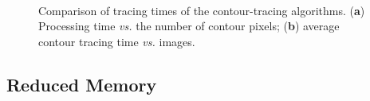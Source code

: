 \documentclass[sensors,article,accept,moreauthors,pdftex,10pt,a4paper]{mdpi}
\begin{document}
\begin{figure}[H]
	\centering
	\\

	\caption{Comparison of tracing times of the contour-tracing algorithms. (\textbf{a}) Processing time \emph{vs.} the number of contour pixels; (\textbf{b}) average contour tracing time \emph{vs.} images.}
	\label{fig:image18}
\end{figure}



\subsection{Reduced Memory}

\end{document}
